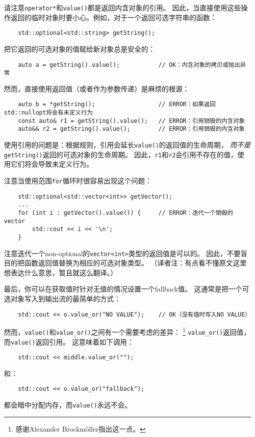 请注意\texttt{operator*}和\texttt{value()}都是返回内含对象的引用。
因此，当直接使用这些操作返回的临时对象时要小心。例如，对于一个返回可选字符串的函数：
\begin{lstlisting}
    std::optional<std::string> getString();
\end{lstlisting}
把它返回的可选对象的值赋给新对象总是安全的：
\begin{lstlisting}
    auto a = getString().value();           // OK：内含对象的拷贝或抛出异常
\end{lstlisting}
然而，直接使用返回值（或者作为参数传递）是麻烦的根源：
\begin{lstlisting}
    auto b = *getString();                  // ERROR：如果返回std::nullopt将会有未定义行为
    const auto& r1 = getString().value();   // ERROR：引用销毁的内含对象
    auto&& r2 = getString().value();        // ERROR：引用销毁的内含对象
\end{lstlisting}
使用引用的问题是：根据规则，引用会延长\texttt{value()}的返回值的生命周期，
\emph{而不是}\texttt{getString()}返回的可选对象的生命周期。
因此，\texttt{r1}和\texttt{r2}会引用不存在的值，使用它们将会导致未定义行为。

注意当使用范围\texttt{for}循环时很容易出现这个问题：
\begin{lstlisting}
    std::optional<std::vector<int>> getVector();
    ...
    for (int i : getVector().value()) {     // ERROR：迭代一个销毁的vector
        std::cout << i << '\n';
    }
\end{lstlisting}
注意迭代一个non-optional的\texttt{vector<int>}类型的返回值是可以的。
因此，不要盲目的把函数返回值替换为相应的可选对象类型。
（译者注：有点看不懂原文这里想表达什么意思，暂且就这么翻译。）

最后，你可以在获取值时针对无值的情况设置一个fallback值。
这通常是把一个可选对象写入到输出流的最简单的方式：
\begin{lstlisting}
    std::cout << o.value_or("NO VALUE");    // OK（没有值时写入NO VALUE）
\end{lstlisting}
然而，\texttt{value()}和\texttt{value\_or()}之间有一个需要考虑的差异：
\footnote{感谢Alexander Brockmöller指出这一点。}
\texttt{value\_or()}返回值，而\texttt{value()}返回引用。
这意味着如下调用：
\begin{lstlisting}
    std::cout << middle.value_or("");
\end{lstlisting}
和：
\begin{lstlisting}
    std::cout << o.value_or("fallback");
\end{lstlisting}
都会暗中分配内存，而\texttt{value()}永远不会。

